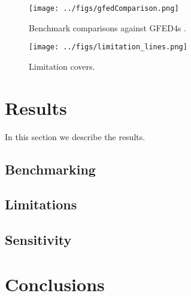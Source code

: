 \documentclass[12pt]{article}
\begin{document}
\begin{figure}[!ht]
  \centering
    \texttt{[image: ../figs/gfedComparison.png]}
   
  \caption{Benchmark comparisons against GFED4s \citep{Giglio2013}.}
\end{figure}


\begin{figure}[!ht]
  \centering
    \texttt{[image: ../figs/limitation\_lines.png]}
   
  \caption{Limitation covers.}
\end{figure}

\section{Results}\label{results}
In this section we describe the results.

\subsection{Benchmarking}

\subsection{Limitations}

\subsection{Sensitivity}

\section{Conclusions}\label{conclusions}




\end{document}
